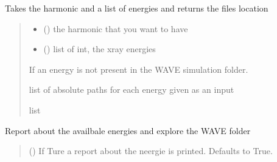 \documentclass[letterpaper,10pt,english]{sphinxmanual}
\begin{document}
\begin{fulllineitems}
\begin{fulllineitems}
\label{\detokenize{API:raypyng.wave_helper.WaveHelper.convert_energies_to_file_list}}
\pysigstartsignatures
\pysiglinewithargsret
{}
{\sphinxparamcomma {}}
{}
\pysigstopsignatures
\sphinxAtStartPar
Takes the harmonic and a list of energies and returns the files location
\begin{quote}\begin{description}
\begin{itemize}
\item {} 
\sphinxAtStartPar
{} () \textendash{} the harmonic that you want to have

\item {} 
\sphinxAtStartPar
{} () \textendash{} list of int, the x\sphinxhyphen{}ray energies

\end{itemize}

\sphinxAtStartPar
{} \textendash{} If an energy is not present in the WAVE simulation folder.

\sphinxAtStartPar
list of absolute paths for each energy given as an input

\sphinxAtStartPar
list

\end{description}\end{quote}

\end{fulllineitems}


\begin{fulllineitems}
\label{\detokenize{API:raypyng.wave_helper.WaveHelper.report_available_energies}}
\pysigstartsignatures
\pysiglinewithargsret
{}
{}
{}
\pysigstopsignatures
\sphinxAtStartPar
Report about the availbale energies and explore the WAVE folder
\begin{quote}\begin{description}
\sphinxAtStartPar
{} (\sphinxstyleliteralemphasis{\sphinxupquote{, }}) \textendash{} If Ture a report about the neergie is printed.
Defaults to True.


\end{description}
\end{quote}
\end{fulllineitems}
\end{fulllineitems}
\end{document}
